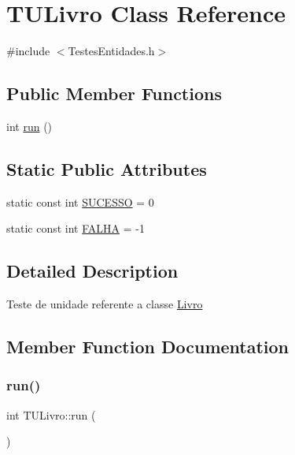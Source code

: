 \hypertarget{class_t_u_livro}{}\section{T\+U\+Livro Class Reference}
\label{class_t_u_livro}


{\ttfamily \#include $<$Testes\+Entidades.\+h$>$}

\subsection*{Public Member Functions}
\begin{DoxyCompactItemize}
\item 
int \hyperlink{class_t_u_livro_ab5966f07d89cd055f1cb35bdf0769169}{run} ()
\end{DoxyCompactItemize}
\subsection*{Static Public Attributes}
\begin{DoxyCompactItemize}
\item 
static const int \hyperlink{class_t_u_livro_a9f66d4598c6c74fea2b06b77e0e1e340}{S\+U\+C\+E\+S\+SO} = 0
\item 
static const int \hyperlink{class_t_u_livro_a15c83153ff3decb1066d41d50c7429c6}{F\+A\+L\+HA} = -\/1
\end{DoxyCompactItemize}


\subsection{Detailed Description}
Teste de unidade referente a classe \hyperlink{class_livro}{Livro} 

\subsection{Member Function Documentation}
\mbox{\label{class_t_u_livro_ab5966f07d89cd055f1cb35bdf0769169}} 
\subsubsection{\texorpdfstring{run()}{run()}}
{\footnotesize\ttfamily int T\+U\+Livro\+::run (\begin{DoxyParamCaption}{ }\end{DoxyParamCaption})}

